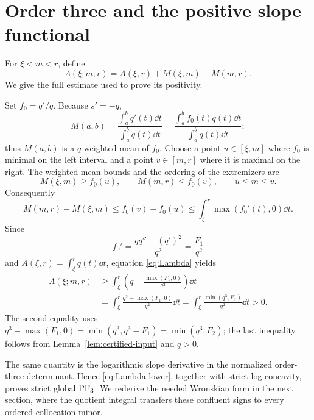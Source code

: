 \section{Order three and the positive slope functional}\label{sec:pf3}

For \(\xi<m<r\), define
\begin{equation}\label{eq:Lambda}
 \Lambda(\xi;m,r)=A(\xi,r)+M(\xi,m)-M(m,r).
\end{equation}
We give the full estimate used to prove its positivity.

Set \(f_0=q'/q\). Because \(s'=-q\),
\[
 M(a,b)=\frac{\int_a^bq'(t)\dd t}{\int_a^bq(t)\dd t}
       =\frac{\int_a^b f_0(t)q(t)\dd t}{\int_a^bq(t)\dd t};
\]
thus \(M(a,b)\) is a \(q\)-weighted mean of \(f_0\). Choose a point
\(u\in[\xi,m]\) where \(f_0\) is minimal on the left interval and a point
\(v\in[m,r]\) where it is maximal on the right. The weighted-mean bounds and
the ordering of the extremizers are
\[
 M(\xi,m)\geq f_0(u),\qquad M(m,r)\leq f_0(v),
 \qquad u\leq m\leq v.
\]
Consequently
\[
 M(m,r)-M(\xi,m)\leq f_0(v)-f_0(u)
 \leq\int_\xi^r\max(f_0'(t),0)\dd t.
\]
Since
\[
 f_0'=\frac{qq''-(q')^2}{q^2}=\frac{F_1}{q^2}
\]
and \(A(\xi,r)=\int_\xi^r q(t)\dd t\), equation
\eqref{eq:Lambda} yields
\begin{align}
 \Lambda(\xi;m,r)
 &\geq\int_\xi^r\left(q-\frac{\max(F_1,0)}{q^2}\right)\dd t\\
 &=\int_\xi^r\frac{q^3-\max(F_1,0)}{q^2}\dd t
 =\int_\xi^r\frac{\min(q^3,F_2)}{q^2}\dd t>0.
 \label{eq:Lambda-lower}
\end{align}
The second equality uses
\(q^3-\max(F_1,0)=\min(q^3,q^3-F_1)=\min(q^3,F_2)\); the last inequality
follows from Lemma~\ref{lem:certified-input} and \(q>0\).

The same quantity is the logarithmic slope derivative in the normalized
order-three determinant. Hence \eqref{eq:Lambda-lower}, together with strict
log-concavity, proves strict global \(\mathrm{PF}_3\). We rederive the needed
Wronskian form in the next section, where the quotient integral transfers
these confluent signs to every ordered collocation minor.
